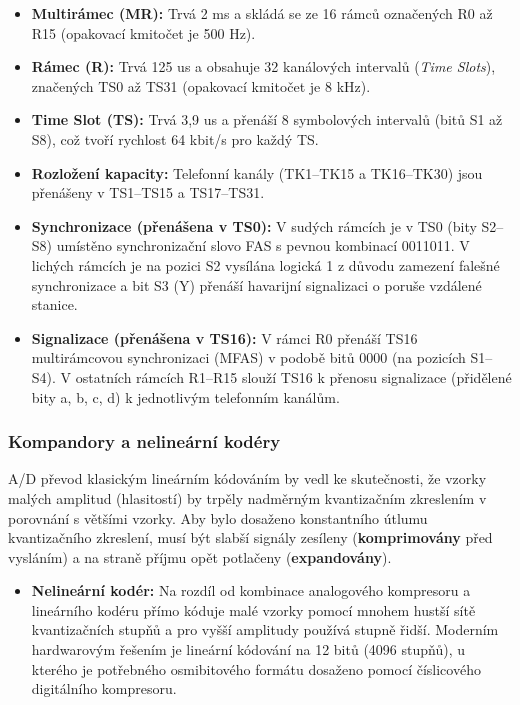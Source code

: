         \begin{itemize}
            \item \textbf{Multirámec (MR):} Trvá 2 ms a skládá se ze 16 rámců označených R0 až R15 (opakovací kmitočet je 500 Hz).
            \item \textbf{Rámec (R):} Trvá 125 us a obsahuje 32 kanálových intervalů (\textit{Time Slots}), značených TS0 až TS31 (opakovací kmitočet je 8 kHz).
            \item \textbf{Time Slot (TS):} Trvá 3,9 us a přenáší 8 symbolových intervalů (bitů S1 až S8), což tvoří rychlost 64 kbit/s pro každý TS.
            \item \textbf{Rozložení kapacity:} Telefonní kanály (TK1--TK15 a TK16--TK30) jsou přenášeny v TS1--TS15 a TS17--TS31.
            \item \textbf{Synchronizace (přenášena v TS0):} V sudých rámcích je v TS0 (bity S2--S8) umístěno synchronizační slovo FAS s pevnou kombinací 0011011. V lichých rámcích je na pozici S2 vysílána logická 1 z důvodu zamezení falešné synchronizace a bit S3 (Y) přenáší havarijní signalizaci o poruše vzdálené stanice.
            \item \textbf{Signalizace (přenášena v TS16):} V rámci R0 přenáší TS16 multirámcovou synchronizaci (MFAS) v podobě bitů 0000 (na pozicích S1--S4). V ostatních rámcích R1--R15 slouží TS16 k přenosu signalizace (přidělené bity a, b, c, d) k jednotlivým telefonním kanálům.
        \end{itemize}
    \subsubsection{Kompandory a nelineární kodéry}
        A/D převod klasickým lineárním kódováním by vedl ke skutečnosti, že vzorky malých amplitud (hlasitostí) by trpěly nadměrným kvantizačním zkreslením v porovnání s většími vzorky. Aby bylo dosaženo konstantního útlumu kvantizačního zkreslení, musí být slabší signály zesíleny (\textbf{komprimovány} před vysláním) a na straně příjmu opět potlačeny (\textbf{expandovány}).
        
        \begin{itemize}
            \item \textbf{Nelineární kodér:} Na rozdíl od kombinace analogového kompresoru a lineárního kodéru přímo kóduje malé vzorky pomocí mnohem hustší sítě kvantizačních stupňů a pro vyšší amplitudy používá stupně řidší. Moderním hardwarovým řešením je lineární kódování na 12 bitů (4096 stupňů), u kterého je potřebného osmibitového formátu dosaženo pomocí číslicového digitálního kompresoru.
        \end{itemize}
